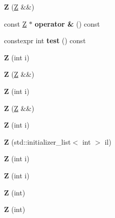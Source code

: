 \begin{DoxyCompactItemize}
\mbox{\label{struct_z_ac53eb4bfb68c3fd654047e8aeb253d82}} 
{\bfseries Z} (\mbox{\hyperlink{struct_z}{Z}} \&\&)
\item 
\mbox{\label{struct_z_a1df855b3e886dd4b94a2ecbdc2975c99}} 
const \mbox{\hyperlink{struct_z}{Z}} $\ast$ {\bfseries operator \&} () const
\item 
\mbox{\label{struct_z_acd54c6ae37f3b303be07365c1a6df94a}} 
constexpr int {\bfseries test} () const
\item 
\mbox{\label{struct_z_a9adee188d04926f42b2d04dbc9ee561a}} 
{\bfseries Z} (int i)
\item 
\mbox{\label{struct_z_ac53eb4bfb68c3fd654047e8aeb253d82}} 
{\bfseries Z} (\mbox{\hyperlink{struct_z}{Z}} \&\&)
\item 
\mbox{\label{struct_z_a9adee188d04926f42b2d04dbc9ee561a}} 
{\bfseries Z} (int i)
\item 
\mbox{\label{struct_z_ac53eb4bfb68c3fd654047e8aeb253d82}} 
{\bfseries Z} (\mbox{\hyperlink{struct_z}{Z}} \&\&)
\item 
\mbox{\label{struct_z_a9adee188d04926f42b2d04dbc9ee561a}} 
{\bfseries Z} (int i)
\item 
\mbox{\label{struct_z_ae8e32461ae3a4118f0cc413a91899e34}} 
{\bfseries Z} (std\+::initializer\+\_\+list$<$ int $>$ il)
\item 
\mbox{\label{struct_z_a9adee188d04926f42b2d04dbc9ee561a}} 
{\bfseries Z} (int i)
\item 
\mbox{\label{struct_z_a9adee188d04926f42b2d04dbc9ee561a}} 
{\bfseries Z} (int i)
\item 
\mbox{\label{struct_z_a023e202cb9477d4eba41e74dcdc17e9d}} 
{\bfseries Z} (int)
\item 
\mbox{\label{struct_z_a023e202cb9477d4eba41e74dcdc17e9d}} 
{\bfseries Z} (int)
\item 
\mbox{\label{struct_z_a9adee188d04926f42b2d04dbc9ee561a}} 

\end{DoxyCompactItemize}
